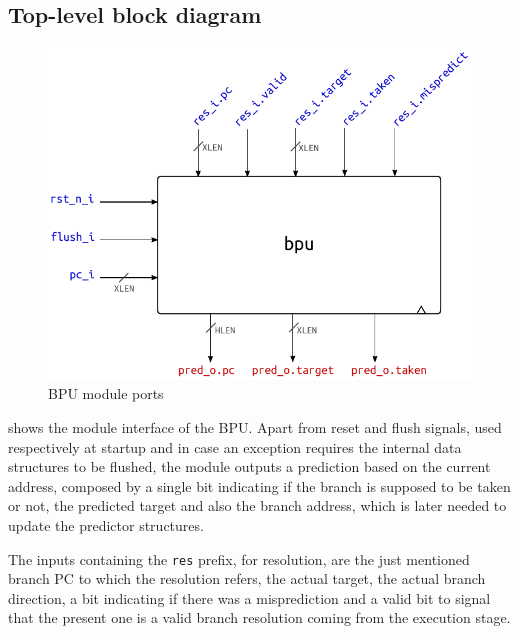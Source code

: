 \subsection{Top-level block diagram}
\begin{figure}[hbt]
  \centering
  \includegraphics[width=.9\textwidth]{img/bpu-top.pdf}
  \caption{\acs{BPU} module ports}
  \label{fig:bpu-top}
\end{figure}
 shows the module interface of the \ac{BPU}. Apart from reset and flush signals, used respectively at startup and in case an exception requires the internal data structures to be flushed, the module outputs a prediction based on the current address, composed by a single bit indicating if the branch is supposed to be taken or not, the predicted target and also the branch address, which is later needed to update the predictor structures.

The inputs containing the \texttt{res} prefix, for resolution, are the just mentioned branch \ac{PC} to which the resolution refers, the actual target, the actual branch direction, a bit indicating if there was a misprediction and a valid bit to signal that the present one is a valid branch resolution coming from the execution stage.

